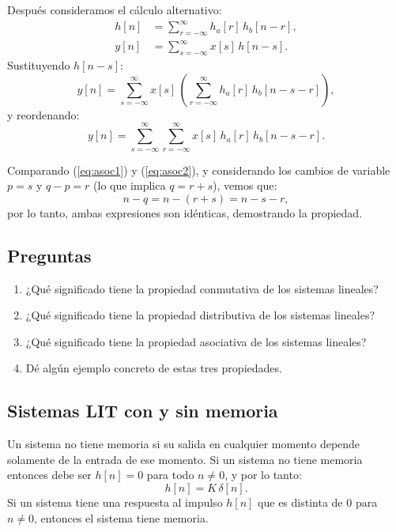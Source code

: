 Después consideramos el cálculo alternativo:
\begin{align}
	h[n] &= \sum_{r=-\infty}^{\infty} h_{a}[r] \, h_{b}[n-r], \\
	y[n] &= \sum_{s=-\infty}^{\infty} x[s] \, h[n-s].
\end{align}
Sustituyendo $h[n-s]$:
\begin{equation}
	y[n] = \sum_{s=-\infty}^{\infty} x[s] \, \left( \sum_{r=-\infty}^{\infty} h_{a}[r] \, h_{b}[n - s - r] \right),
\end{equation}
y reordenando:
\begin{equation}
	y[n] = \sum_{s=-\infty}^{\infty} \sum_{r=-\infty}^{\infty} x[s] \, h_{a}[r] \, h_{b}[n - s - r]. \label{eq:asoc2}
\end{equation}

Comparando (\ref{eq:asoc1}) y (\ref{eq:asoc2}), y considerando los cambios de variable $p = s$ y $q - p = r$ (lo que implica $q = r + s$), vemos que:
\begin{equation}
	n - q = n - (r + s) = n - s - r, 
\end{equation}
por lo tanto, ambas expresiones son idénticas, demostrando la propiedad.

\subsection{Preguntas}

\begin{enumerate}
	\item ¿Qué significado tiene la propiedad conmutativa de los sistemas lineales?
	\item ¿Qué significado tiene la propiedad distributiva de los sistemas lineales?
	\item ¿Qué significado tiene la propiedad asociativa de los sistemas lineales?
	\item Dé algún ejemplo concreto de estas tres propiedades.
\end{enumerate}

\subsection{Sistemas LIT con y sin memoria}

Un sistema no tiene memoria si su salida en cualquier momento depende solamente de la entrada de ese momento. Si un sistema no tiene memoria entonces debe ser $h[n]=0$ para todo $n \neq 0$, y por lo tanto:
\begin{equation}
	h[n] = K \, \delta[n] .
\end{equation}
Si un sistema tiene una respuesta al impulso $h[n]$ que es distinta de $0$ para $n \neq 0$, entonces el sistema tiene memoria.

